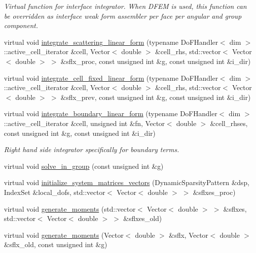 \begin{DoxyCompactItemize}
\begin{DoxyCompactList}\small\item\em Virtual function for interface integrator. When D\+F\+EM is used, this function can be overridden as interface weak form assembler per face per angular and group component. \end{DoxyCompactList}\item 
virtual void \hyperlink{class_equation_base_aca5998c1afd2b89ee93d3fbbfde7f3d0}{integrate\+\_\+scattering\+\_\+linear\+\_\+form} (typename Do\+F\+Handler$<$ dim $>$\+::active\+\_\+cell\+\_\+iterator \&cell, Vector$<$ double $>$ \&cell\+\_\+rhs, std\+::vector$<$ Vector$<$ double $>$ $>$ \&sflx\+\_\+proc, const unsigned int \&g, const unsigned int \&i\+\_\+dir)
\item 
virtual void \hyperlink{class_equation_base_ae8472f5c20d76c7d01e5660f8377887e}{integrate\+\_\+cell\+\_\+fixed\+\_\+linear\+\_\+form} (typename Do\+F\+Handler$<$ dim $>$\+::active\+\_\+cell\+\_\+iterator \&cell, Vector$<$ double $>$ \&cell\+\_\+rhs, std\+::vector$<$ Vector$<$ double $>$ $>$ \&sflx\+\_\+prev, const unsigned int \&g, const unsigned int \&i\+\_\+dir)
\item 
virtual void \hyperlink{class_equation_base_a1a213c4e21984bead9146e50be97077f}{integrate\+\_\+boundary\+\_\+linear\+\_\+form} (typename Do\+F\+Handler$<$ dim $>$\+::active\+\_\+cell\+\_\+iterator \&cell, unsigned int \&fn, Vector$<$ double $>$ \&cell\+\_\+rhses, const unsigned int \&g, const unsigned int \&i\+\_\+dir)
\begin{DoxyCompactList}\small\item\em Right hand side integrator specifically for boundary terms. \end{DoxyCompactList}\item 
virtual void \hyperlink{class_equation_base_a591282eb0ced01a7f22e29e7f0f44129}{solve\+\_\+in\+\_\+group} (const unsigned int \&g)
\item 
virtual void \hyperlink{class_equation_base_a25ff3b8e1a0c98dc5077e6afbac6606c}{initialize\+\_\+system\+\_\+matrices\+\_\+vectors} (Dynamic\+Sparsity\+Pattern \&dsp, Index\+Set \&local\+\_\+dofs, std\+::vector$<$ Vector$<$ double $>$ $>$ \&sflxes\+\_\+proc)
\item 
virtual void \hyperlink{class_equation_base_aa6ea21eec0c4e3e1dbb17da25b0633d3}{generate\+\_\+moments} (std\+::vector$<$ Vector$<$ double $>$ $>$ \&sflxes, std\+::vector$<$ Vector$<$ double $>$ $>$ \&sflxes\+\_\+old)
\item 
virtual void \hyperlink{class_equation_base_a893affe5706a8798bed68bb4ff531eec}{generate\+\_\+moments} (Vector$<$ double $>$ \&sflx, Vector$<$ double $>$ \&sflx\+\_\+old, const unsigned int \&g)

\end{DoxyCompactItemize}
